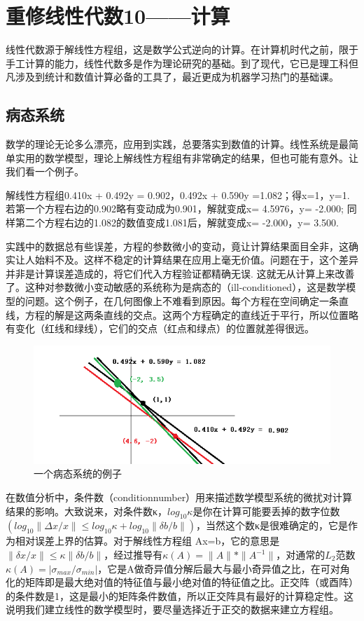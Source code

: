 \chapter{重修线性代数10——计算}

线性代数源于解线性方程组，这是数学公式逆向的计算。在计算机时代之前，限于手工计算的能力，线性代数多是作为理论研究的基础。到了现代，它已是理工科但凡涉及到统计和数值计算必备的工具了，最近更成为机器学习热门的基础课。

\section{病态系统}

数学的理论无论多么漂亮，应用到实践，总要落实到数值的计算。线性系统是最简单实用的数学模型，理论上解线性方程组有非常确定的结果，但也可能有意外。让我们看一个例子。

\kaishu

解线性方程组0.410x + 0.492y = 0.902，0.492x + 0.590y =1.082；得x=1，y=1. 若第一个方程右边的0.902略有变动成为0.901，解就变成x= 4.5976，y= -2.000; 同样第二个方程右边的1.082的数值变成1.081后，解就变成x= -2.000，y= 3.500.

\songti

实践中的数据总有些误差，方程的参数微小的变动，竟让计算结果面目全非，这确实让人始料不及。这样不稳定的计算结果在应用上毫无价值。问题在于，这个差异并非是计算误差造成的，将它们代入方程验证都精确无误. 这就无从计算上来改善了。这种对参数微小变动敏感的系统称为是病态的（ill-conditioned），这是数学模型的问题。这个例子，在几何图像上不难看到原因。每个方程在空间确定一条直线，方程的解是这两条直线的交点。这两个方程确定的直线近于平行，所以位置略有变化（红线和绿线），它们的交点（红点和绿点）的位置就差得很远。

\begin{figure}[h]
	\centering
	\includegraphics[width=0.7\linewidth]{pic/1612386nrnueyrye6k8kq4.png}
	\caption{一个病态系统的例子}
	\label{fig:1612386nrnueyrye6k8kq4}
\end{figure}

在数值分析中，条件数（conditionnumber）用来描述数学模型系统的微扰对计算结果的影响。大致说来，对条件数κ，$ log_{10}κ $是你在计算可能要丢掉的数字位数$ (log_{10}\|Δx/x\|\leq log_{10}κ+ log_{10}\|\delta b/b\|) $，当然这个数κ是很难确定的，它是作为相对误差上界的估算。对于解线性方程组 Ax=b，它的意思是$ \|\delta x/x\| \leq κ\|\delta b/b\| $，经过推导有$ κ(A) =\|A\|*\|A^{-1}\| $，对通常的$ L_{2} $范数$ κ(A)= |\sigma_{max} /\sigma_{min}| $，它是A做奇异值分解后最大与最小奇异值之比，在可对角化的矩阵即是最大绝对值的特征值与最小绝对值的特征值之比。正交阵（或酉阵）的条件数是1，这是最小的矩阵条件数值，所以正交阵具有最好的计算稳定性。这说明我们建立线性的数学模型时，要尽量选择近于正交的数据来建立方程组。

